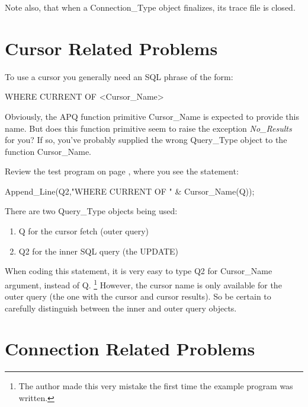 \documentclass[english,letterpaper]{book}
\begin{document}
Note also, that when a Connection\_Type object finalizes, its trace
file is closed.


\section{Cursor Related Problems}

To use a cursor you generally need an SQL phrase of the form:

\begin{SQL}

   WHERE CURRENT OF <Cursor_Name>

\end{SQL}

Obviously, the APQ function primitive Cursor\_Name is expected to
provide this name. But does this function primitive seem to raise
the exception \emph{No\_Results} for you? If so, you've probably supplied
the wrong Query\_Type object to the function Cursor\_Name.

Review the test program on page \pageref{Cursor Example Program},
where you see the statement:

\begin{Example}

   Append_Line(Q2,"WHERE CURRENT OF " & Cursor_Name(Q));

\end{Example}

There are two Query\_Type objects being used:

\begin{enumerate}
   \item Q for the cursor fetch (outer query)
   \item Q2 for the inner SQL query (the UPDATE)
\end{enumerate}

When coding this statement, it is very easy to type Q2 for Cursor\_Name
argument, instead of Q.%
\footnote{The author made this very mistake the first time the example program
was written.%
} However, the cursor name is only available for the outer query (the
one with the cursor and cursor results). So be certain to carefully
distinguish between the inner and outer query objects.


\section{Connection Related Problems}
\end{document}
